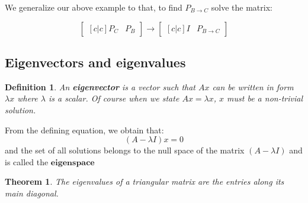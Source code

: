 \documentclass[titlepage]{article}
\newtheorem{thm}{Theorem}[subsection]
\newtheorem{definition}{Definition}[subsection]
\numberwithin{equation}{subsection}
\begin{document}
We generalize our above example to that, to find $P_{B\to C}$ solve the matrix:

$$\begin{bmatrix}[c|c]
    P_{C} & P_{B}
\end{bmatrix} \rightarrow \begin{bmatrix}[c|c]
    I & P_{B\to C}
\end{bmatrix}$$

\subsection{Eigenvectors and eigenvalues}

\begin{definition}
An \textbf{eigenvector} is a vector such that $Ax$ can be written in form $\lambda x$ where $\lambda$ is a scalar. Of course when we state $Ax=\lambda x$, $x$ must be a non-trivial solution. 
\end{definition}

From the defining equation, we obtain that:
$$ (A - \lambda I)x = 0$$ and the set of all solutions belongs to the null space of the matrix $(A - \lambda I)$ and is called the $\textbf{eigenspace}$

\begin{thm}
The eigenvalues of a triangular matrix are the entries along its main diagonal. 
\end{thm}
\end{document}
